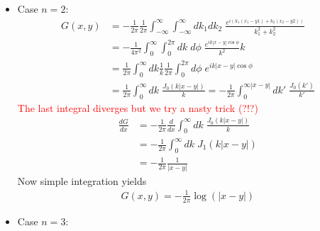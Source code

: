 \documentclass[10pt,a4paper]{article}
\theoremstyle{definition}
\begin{document}
\begin{itemize}
\begin{center}
        \end{center}
        \item Case $n=2$:
        \begin{align}
            G(x,y)&=-\frac{1}{2\pi}\frac{1}{2\pi}\int_{-\infty}^\infty \int_{-\infty}^\infty dk_1 dk_2\; \frac{e^{i(k_1(x_1-y1)+k_2(x_2-y2))}}{k_1^2+k_2^2}\\
            &=-\frac{1}{4\pi^2}\int_{0}^\infty \int_{0}^{2\pi} dk\;d\phi\; \frac{e^{ik |x-y|\cos\phi}}{k^2}k\\
            &=\frac{1}{2\pi}\int_{0}^\infty dk \frac{1}{k}\frac{1}{2\pi}\int_{0}^{2\pi} d\phi\; e^{ik |x-y|\cos\phi}\\
            &=\frac{1}{2\pi}\int_{0}^\infty dk \; \frac{J_0(k|x-y|)}{k}=-\frac{1}{2\pi}\int_{0}^{\infty|x-y|} dk' \; \frac{J_0(k')}{k'}
        \end{align}
        \textcolor{red}{The last integral diverges but we try a nasty trick (?!?)}
        \begin{align}
            \frac{dG}{dx}&=-\frac{1}{2\pi}\frac{d}{dx}\int_{0}^{\infty} dk \; \frac{J_0(k|x-y|)}{k}\\
            &=-\frac{1}{2\pi}\int_{0}^{\infty} dk \; J_1(k|x-y|)\\
            &=-\frac{1}{2\pi}\frac{1}{|x-y|}
        \end{align}
        Now simple integration yields
        \begin{align}
            G(x,y)=-\frac{1}{2\pi}\log(|x-y|)
        \end{align}
        \item Case $n=3$:
        \begin{align}

\end{align}
\end{itemize}
\end{document}
